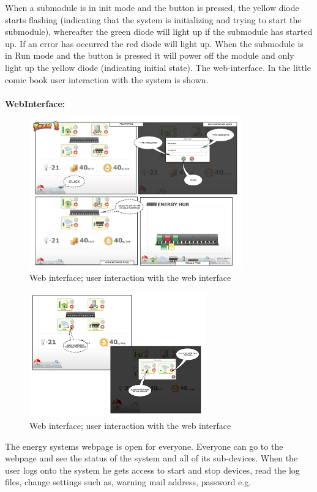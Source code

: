		When a submodule is in init mode and the button is pressed, the yellow diode starts flashing (indicating that the system is initializing and trying to start the submodule), whereafter
		the green diode will light up if the submodule has started up. If an error has occurred the red diode will light up. 
		When the submodule is in Run mode and the button is pressed it will power off the module and only light up the yellow diode (indicating initial state).
		The web-interface. In the little comic book user interaction with the system is shown.
		\\ \\\textbf{WebInterface: }
		\begin{figure}[h!]		%
			\begin{centering}
				 \includegraphics[width=0.82\textwidth]{images/web_interface1.jpg}
				\caption{Web interface; user interaction with the web interface}
		 	\end{centering}
		\end{figure}

		\begin{figure}[h!]		%
			\begin{centering}
				 \includegraphics[width=0.68\textwidth]{images/web_interface2.jpg}
				\caption{Web interface; user interaction with the web interface}
		 	\end{centering}
		\end{figure}			
		\newpage
		The energy systems webpage is open for everyone. Everyone can go to the webpage and see the status of the system and all of its sub-devices.
		When the user logs onto the system he gets access to start and stop devices, read the log files, change settings such as, warning mail address,
		password e.g.
	\newpage
